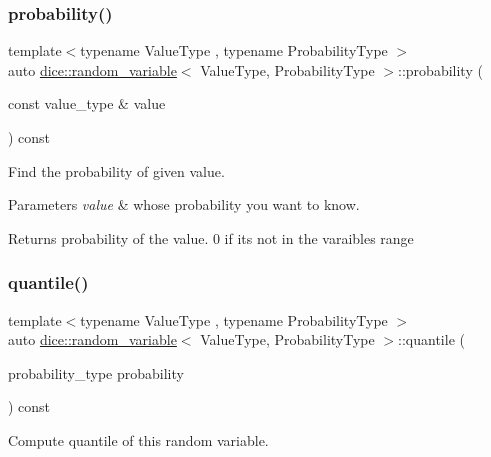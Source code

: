 \subsubsection{\texorpdfstring{probability()}{probability()}}
{\footnotesize\ttfamily template$<$typename Value\+Type , typename Probability\+Type $>$ \\
auto \mbox{\hyperlink{classdice_1_1random__variable}{dice\+::random\+\_\+variable}}$<$ Value\+Type, Probability\+Type $>$\+::probability (\begin{DoxyParamCaption}\item[{const value\+\_\+type \&}]{value }\end{DoxyParamCaption}) const\hspace{0.3cm}{\ttfamily [inline]}}



Find the probability of given value. 


\begin{DoxyParams}{Parameters}
{\em value} & whose probability you want to know.\\
\hline
\end{DoxyParams}
\begin{DoxyReturn}{Returns}
probability of the value. 0 if it\textquotesingle{}s not in the varaible\textquotesingle{}s range 
\end{DoxyReturn}
\mbox{\label{classdice_1_1random__variable_aa1c5beebc469a8cc51906fd0b48ef5b1}} 
\subsubsection{\texorpdfstring{quantile()}{quantile()}}
{\footnotesize\ttfamily template$<$typename Value\+Type , typename Probability\+Type $>$ \\
auto \mbox{\hyperlink{classdice_1_1random__variable}{dice\+::random\+\_\+variable}}$<$ Value\+Type, Probability\+Type $>$\+::quantile (\begin{DoxyParamCaption}\item[{probability\+\_\+type}]{probability }\end{DoxyParamCaption}) const\hspace{0.3cm}{\ttfamily [inline]}}



Compute quantile of this random variable. 

